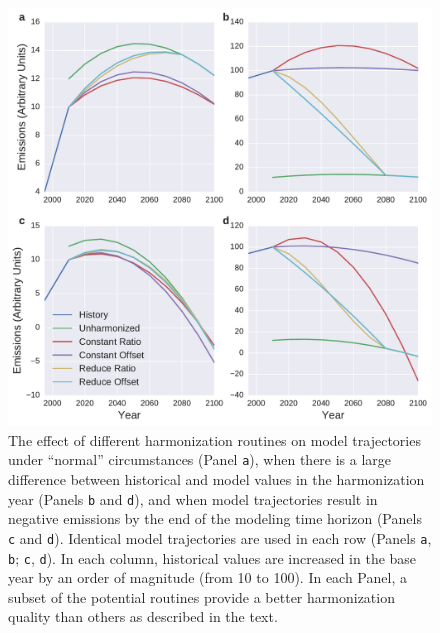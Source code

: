 \documentclass[review]{elsarticle}
\newcommand{\code}[1]{\lstinline[basicstyle=\ttfamily\color{black}]|#1|}
\begin{document}
\begin{figure}
  \begin{center}
    \includegraphics[width=\textwidth]{cases.pdf}
    \caption[]{
      \label{fig:cases}
      The effect of different harmonization routines on model trajectories under
      ``normal'' circumstances (Panel \code{a}), when there is a large
      difference between historical and model values in the harmonization year
      (Panels \code{b} and \code{d}), and when model trajectories result in
      negative emissions by the end of the modeling time horizon (Panels
      \code{c} and \code{d}). Identical model trajectories are used in each row
      (Panels \code{a}, \code{b}; \code{c}, \code{d}). In each column,
      historical values are increased in the base year by an order of magnitude
      (from 10 to 100). In each Panel, a subset of the potential routines
      provide a better harmonization quality than others as described in the
      text.
    }
  \end{center}
\end{figure}
\end{document}
